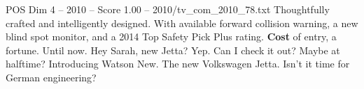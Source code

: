 \begin{textsample}{POS Dim 4 – 2010 – Score 1.00 – 2010/tv\_com\_2010\_78.txt}  \label{ex:f4_pos_054}
Thoughtfully crafted and intelligently designed.
With available forward collision warning, a new blind spot monitor, and a 2014 Top Safety Pick Plus rating. \textbf{Cost} of entry, a fortune.
Until now.
Hey Sarah, new Jetta?
Yep.
Can I check it out?
Maybe at halftime?
Introducing Watson New.
The new Volkswagen Jetta.
Isn't it time for German engineering?

\end{textsample}
